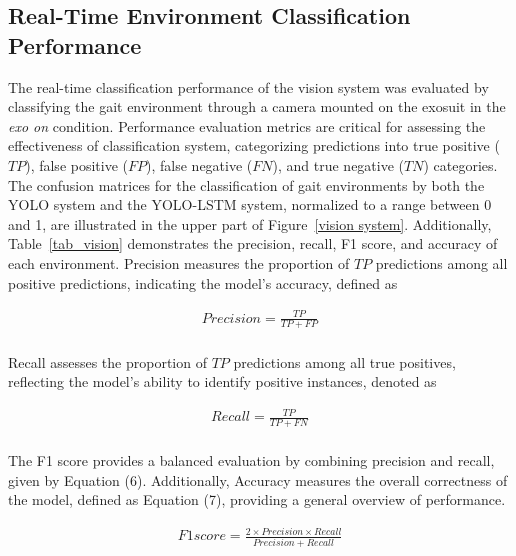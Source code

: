 \documentclass[actuators,article,accept,pdftex,moreauthors]{Definitions/mdpi}
\begin{document}
\subsection{{Real-Time Environment Classification Performance}}
The real-time classification performance of the vision system was evaluated by classifying the gait environment through a camera mounted on the exosuit in the \textit{exo on} condition. Performance evaluation metrics are critical for assessing the effectiveness of classification system, categorizing predictions into true positive ($TP$), false positive ($FP$), false negative ($FN$), and true negative ($TN$) categories. The confusion matrices for the classification of gait environments by both the YOLO system and the YOLO-LSTM system, normalized to a range between 0 and 1, are illustrated in the upper part of Figure~\ref{vision system}. Additionally, Table~\ref{tab_vision} demonstrates the precision, recall, F1 score, and accuracy of each environment. 
Precision measures the proportion of $TP$ predictions among all positive predictions, indicating the model's accuracy, defined as
\begin{linenomath}
\begin{equation}
\begin{aligned}
\text{$Precision = \frac{TP}{TP+FP}$} \\
\end{aligned}
\end{equation}
\end{linenomath}

Recall assesses the proportion of $TP$ predictions among all true positives, reflecting the model's ability to identify positive instances, denoted as
\begin{linenomath}
\begin{equation}
\begin{aligned}
\text{$Recall = \frac{TP}{TP+FN}$} \\
\end{aligned}
\end{equation}
\end{linenomath}

The F1 score provides a balanced evaluation by combining precision and recall, given by Equation (6). 
Additionally, Accuracy measures the overall correctness of the model, defined as Equation (7), providing a general overview of performance. 
\begin{linenomath}
\begin{equation}
\begin{aligned}
\text{$F1score = \frac{2\times Precision \times Recall}{Precision+Recall}$}
\end{aligned}
\end{equation}
\end{linenomath}
\end{document}
